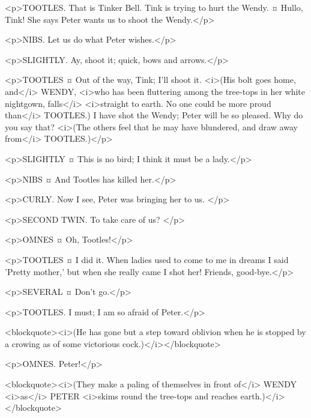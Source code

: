 <p>TOOTLES. That is Tinker Bell. Tink is trying to hurt the Wendy.
¤
Hullo, Tink!
She says Peter wants us to shoot the Wendy.</p>

<p>NIBS. Let us do what Peter wishes.</p>

<p>SLIGHTLY. Ay, shoot it; quick, bows and arrows.</p>

<p>TOOTLES ¤
Out of the way, Tink; I'll shoot it. <i>(His bolt goes home, and</i> WENDY, <i>who has been fluttering among the tree-tops in her white nightgown, falls</i> <i>straight to earth. No one could be more proud than</i> TOOTLES.) I have shot the Wendy; Peter will be so pleased.
Why do you say that? <i>(The others feel that he may have blundered, and draw away from</i> TOOTLES.)</p>

<p>SLIGHTLY ¤
This is no bird; I think it must be a lady.</p>

<p>NIBS ¤
And Tootles has killed her.</p>

<p>CURLY. Now I see, Peter was bringing her to us.
</p>

<p>SECOND TWIN. To take care of us?
</p>

<p>OMNES ¤
Oh, Tootles!</p>

<p>TOOTLES ¤
I did it. When ladies used to come to me in dreams I said 'Pretty mother,' but when she really came I shot her!
Friends, good-bye.</p>

<p>SEVERAL ¤
Don't go.</p>

<p>TOOTLES. I must; I am so afraid of Peter.</p>

<blockquote><i>(He has gone but a step toward oblivion when he is stopped by a crowing as of some victorious cock.)</i></blockquote>

<p>OMNES. Peter!</p>

<blockquote><i>(They make a paling of themselves in front of</i> WENDY <i>as</i> PETER <i>skims round the tree-tops and reaches earth.)</i></blockquote>

